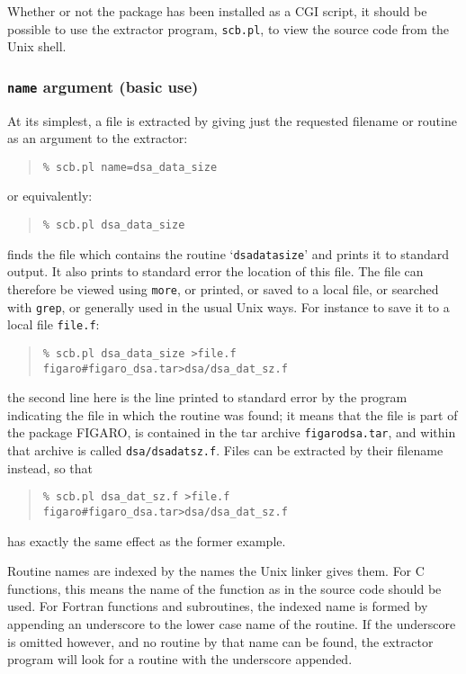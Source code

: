 \documentclass[twoside,11pt]{article}
\newcommand{\xlabel}[1]{}
\renewcommand{\_}{\texttt{\symbol{95}}}
\begin{document}
Whether or not the package has been installed as a CGI script,
it should be 
possible to use the extractor program, {\tt scb.pl},
to view the source code from the Unix shell.

\subsubsection{\xlabel{sec:extract-name}\label{sec:extract-name}{\tt name} argument (basic use)}

At its simplest, a file is extracted by giving just the 
requested filename or routine as an argument to the extractor:
\begin{quote}
\begin{verbatim}
% scb.pl name=dsa_data_size
\end{verbatim}
\end{quote}
or equivalently:
\begin{quote}
\begin{verbatim}
% scb.pl dsa_data_size
\end{verbatim}
\end{quote}
finds the file which contains the routine `{\tt dsa\_data\_size}'
and prints it to standard output.  It also
prints to standard error the location of this file.
The file can therefore be viewed using {\tt more}, or printed,
or saved to a local file, or searched with {\tt grep}, or
generally used in the usual Unix ways.
For instance to save it to a local file {\tt file.f}:
\begin{quote}
\begin{verbatim}
% scb.pl dsa_data_size >file.f
figaro#figaro_dsa.tar>dsa/dsa_dat_sz.f
\end{verbatim}
\end{quote}
the second line here is the line printed to standard error 
by the program indicating the file in which the routine was found;
it means that the file is part of the package FIGARO,
is contained in the tar archive {\tt figaro\_dsa.tar}, and
within that archive is called {\tt dsa/dsa\_dat\_sz.f}.
Files can be extracted by their filename instead,
so that
\begin{quote}
\begin{verbatim}
% scb.pl dsa_dat_sz.f >file.f
figaro#figaro_dsa.tar>dsa/dsa_dat_sz.f
\end{verbatim}
\end{quote}
has exactly the same effect as the former example.

Routine names are indexed by the names the Unix linker gives them.
For C functions, this means the name of the function as in the 
source code should be used.
For Fortran functions and subroutines, the indexed name is 
formed by appending an underscore to the lower case name of the 
routine.  
If the underscore is omitted however, and no routine by that name
can be found, the extractor program will look for a routine with
the underscore appended.
\end{document}
